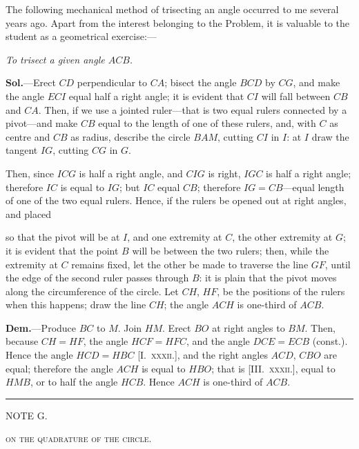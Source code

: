 \documentclass[oneside]{book}
\newcommand{\ibksp}{\hspace{-1.5em}}
\newcommand\imgcent[2]{
\begin{center}

\end{center}
}
\begin{document}
\begin{footnotesize}
The following mechanical method of trisecting an angle occurred
to me several years ago. Apart from the interest belonging
to the Problem, it is valuable to the student as a geometrical
exercise:---

\smallskip
\emph{To trisect a given angle $ACB$.}

\smallskip

\imgcent{204}{f254}

\textbf{Sol.}---Erect $CD$ perpendicular to $CA$; bisect the angle $BCD$
by $CG$, and make the angle $ECI$ equal half a right angle; it is
evident that $CI$ will fall between $CB$ and $CA$. Then, if we use a
jointed ruler---that is two equal rulers connected by a pivot---and
make $CB$ equal to the length of one of these rulers, and, with $C$
as centre and $CB$ as radius, describe the circle $BAM$, cutting
$CI$ in $I$: at $I$ draw the tangent $IG$, cutting $CG$ in $G$.

Then, since $ICG$ is half a right angle, and $CIG$ is right, $IGC$ is
half a right angle; therefore $IC$ is equal to $IG$; but $IC$ equal $CB$;
therefore $IG = CB$---equal length of one of the two equal rulers.
Hence, if the rulers be opened out at right angles, and placed

so that the pivot will be at $I$, and one extremity at $C$, the other
extremity at $G$; it is evident that the point $B$ will be between
the two rulers; then, while the extremity at $C$ remains fixed, let
the other be made to traverse the line $GF$, until the edge of the
second ruler passes through $B$: it is plain that the pivot moves
along the circumference of the circle. Let $CH$, $HF$, be the positions
of the rulers when this happens; draw the line $CH$; the
angle $ACH$ is one-third of $ACB$.

\textbf{Dem.}---Produce $BC$ to $M$. Join $HM$. Erect $BO$ at right
angles to $BM$. Then, because $CH=HF$, the angle $HCF = HFC$,
and the angle $DCE = ECB$ (const.). Hence the angle $HCD
= HBC$ [I.~\textsc{xxxii.}], and the right angles $ACD$, $CBO$ are equal;
therefore the angle $ACH$ is equal to $HBO$; that is [III\@.~\textsc{xxxii.}],
equal to $HMB$, or to half the angle $HCB$. Hence $ACH$ is one-third
of $ACB$.
\end{footnotesize}


\bigskip
\begin{center}
\rule[.5ex]{3cm}{1pt}

\bigskip
\addcontentsline{toc}{section}{\ibksp G.---On the quadrature of the circle,}
{\large NOTE G.}
\medskip

\textsc{on the quadrature of the circle.}
\end{center}
\end{document}

